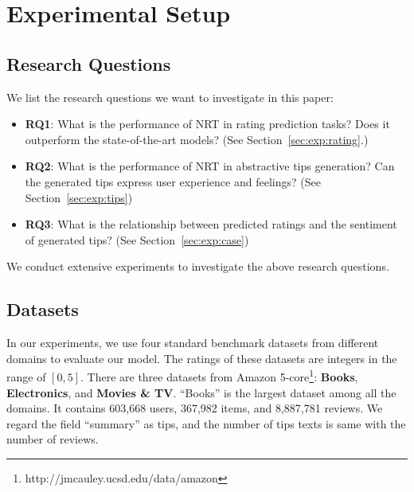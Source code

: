 \documentclass[sigconf]{acmart}
\begin{document}

\section{Experimental Setup}
\label{section4}

\subsection{Research Questions}
We list the research questions we want to investigate in this paper:

\begin{itemize}
	\item \textbf{RQ1}: What is the performance of NRT in rating prediction tasks? Does it outperform the state-of-the-art models? (See Section~\ref{sec:exp:rating}.)
	
	\item \textbf{RQ2}: What is the performance of NRT in abstractive tips generation? Can the generated tips express user experience and feelings? (See Section~\ref{sec:exp:tips})
	
	\item \textbf{RQ3}: What is the relationship between predicted ratings and the sentiment of generated tips? (See Section~\ref{sec:exp:case})
	
\end{itemize}

We conduct extensive experiments to investigate the above research questions.

\subsection{Datasets}
In our experiments, we use four standard benchmark datasets from different domains to evaluate our model. The ratings of these datasets are integers in the range of $[0, 5]$.
There are three datasets from Amazon 5-core\footnote{http://jmcauley.ucsd.edu/data/amazon}: \textbf{Books}, \textbf{Electronics}, and \textbf{Movies \& TV}.
``Books'' is the largest dataset among all the domains. It contains 603,668 users, 367,982 items, and  8,887,781 reviews.
We regard the field ``summary'' as tips, and the number of tips texts is same with the number of reviews.
\end{document}
